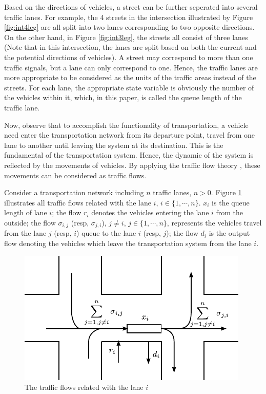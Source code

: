 \documentclass[preprint,authoryear,12pt]{elsarticle}
\begin{document}
Based on the directions of vehicles, a street can be further seperated into several traffic lanes. For example, the 4 streets in the intersection illustrated by Figure \ref{fig:int4leg} are all split into two lanes corresponding to two opposite directions. On the other hand, in Figure \ref{fig:int3leg}, the streets all consist of three lanes (Note that in this intersection, the lanes are split based on both the current and the potential directions of vehicles). A street may correspond to more than one traffic signals, but a lane can only correspond to one. Hence, the traffic lanes are more appropriate to be considered as the units of the traffic areas instead of the streets.
For each lane, the appropriate state variable is obviously the number of the vehicles within it, which, in this paper, is called the queue length of the traffic lane.

Now, observe that to accomplish the functionality of transportation, a vehicle need enter the transportation network from its departure point, travel from one lane to another until leaving the system at its destination. This is the fundamental of the transportation system. Hence, the dynamic of the system is reflected by the movements of vehicles. By applying the traffic flow theory \citep{nathan_h_gartner_revised_2005}, these movements can be considered as traffic flows.

Consider a transportation network including $n$ traffic lanes, $n>0$. Figure \ref{fig:flows} illustrates all traffic flows related with the lane $i$, $i\in\{1,\cdots,n\}$. $x_i$ is the queue length of lane $i$; the flow $r_i$ denotes the vehicles entering the lane $i$ from the outside; the flow $\sigma_{i,j}$ (resp, $\sigma_{j,i}$), $j\neq i$, $j\in\{1,\cdots,n\}$, represents the vehicles travel from the lane $j$ (resp, $i$) queue to the lane $i$ (resp, $j$); the flow $d_{i}$ is the output flow denoting the vehicles which leave the transportation system from the lane $i$.

\begin{figure}[ht]
  \centering
  \includegraphics{pics/flows}
  \caption{The traffic flows related with the lane $i$}
  \label{fig:flows}
\end{figure}
\end{document}
